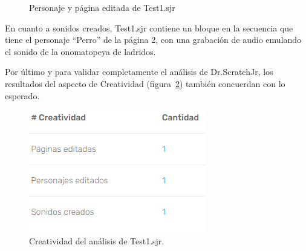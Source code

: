 \documentclass[a4paper, 12pt]{book}
\begin{document}
\begin{figure}[H]
 \centering
    \hfill
 \caption{Personaje y página editada de Test1.sjr} \label{fig:editados}
\end{figure}

En cuanto a sonidos creados, Test1.sjr contiene un bloque en la secuencia que tiene el personaje ``Perro'' de la página 2, con una grabación de audio emulando el sonido de la onomatopeya de ladridos.

\vspace{5mm}
Por último y para validar completamente el análisis de Dr.ScratchJr, los resultados del aspecto de Creatividad (figura~\ref{fig:creatividad_Test1}) también concuerdan con lo esperado.

\begin{figure}[H]
  \centering
  \includegraphics[keepaspectratio]{img/creatividad_Test1.png}
  \caption{Creatividad del análisis de Test1.sjr.}
  \label{fig:creatividad_Test1}
\end{figure}
\end{document}
